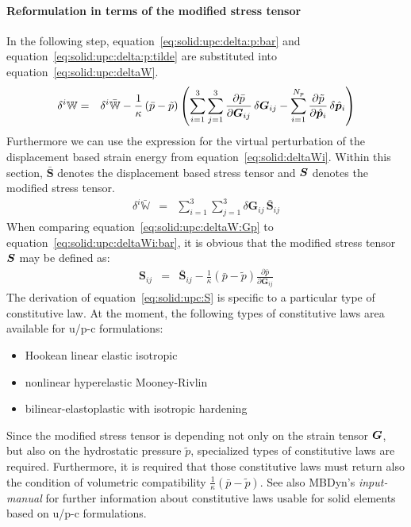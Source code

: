 \paragraph{Reformulation in terms of the modified stress tensor}
In the following step, equation~\ref{eq:solid:upc:delta:p:bar} and equation~\ref{eq:solid:upc:delta:p:tilde} are substituted into equation~\ref{eq:solid:upc:deltaW}.
\begin{eqnarray}
\delta^i\mathbb{W} & = &\delta^i\bar{\mathbb{W}} - \frac{1}{\kappa}\left(\bar{p} - \tilde{p}\right)\left(\sum_{i=1}^{3}\sum_{j=1}^{3}\frac{\partial \bar{p}}{\partial \boldsymbol{G}_{ij}}\,\delta\boldsymbol{G}_{ij} - \sum_{i=1}^{N_p}\frac{\partial \tilde{p}}{\partial \hat{\bm{p}}_i}\,\delta\hat{\bm{p}}_i\right) \label{eq:solid:upc:deltaW:Gp}
\end{eqnarray}
Furthermore we can use the expression for the virtual perturbation of the displacement based strain energy from equation~\ref{eq:solid:deltaWi}.
Within this section, $\bar{\boldsymbol{S}}$ denotes the displacement based stress tensor and $\bm{S}$ denotes the modified stress tensor.
\begin{eqnarray}
\delta^i\bar{\mathbb{W}} & = & \sum_{i=1}^{3}\sum_{j=1}^{3} \delta\boldsymbol{G}_{ij}\,\bar{\boldsymbol{S}}_{ij} \label{eq:solid:upc:deltaWi:bar}
\end{eqnarray}
When comparing equation~\ref{eq:solid:upc:deltaW:Gp} to equation~\ref{eq:solid:upc:deltaWi:bar}, it is obvious that the modified stress tensor $\bm{S}$ may be defined as:
\begin{eqnarray}
\boldsymbol{S}_{ij} & = & \bar{\boldsymbol{S}}_{ij} - \frac{1}{\kappa}\left(\bar{p} - \tilde{p}\right)\frac{\partial \bar{p}}{\partial \boldsymbol{G}_{ij}} \label{eq:solid:upc:S}
\end{eqnarray}
The derivation of equation~\ref{eq:solid:upc:S} is specific to a particular type of constitutive law.
At the moment, the following types of constitutive laws area available for u/p-c formulations:
\begin{itemize}
\item Hookean linear elastic isotropic
\item nonlinear hyperelastic Mooney-Rivlin
\item bilinear-elastoplastic with isotropic hardening
\end{itemize}
Since the modified stress tensor is depending not only on the strain tensor $\bm{G}$, but also on the hydrostatic pressure $\tilde{p}$,
specialized types of constitutive laws are required. Furthermore, it is required that those constitutive laws
must return also the condition of volumetric compatibility $\frac{1}{\kappa}\left(\bar{p} - \tilde{p}\right)$.
See also MBDyn's \emph{input-manual} for further information about constitutive laws usable for solid elements based on u/p-c formulations.
